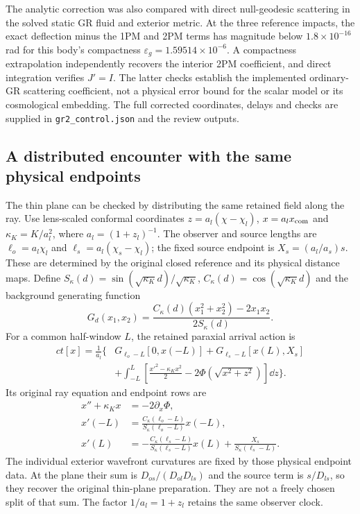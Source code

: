 The analytic correction was also compared with direct null-geodesic
scattering in the solved static GR fluid and exterior metric. At the
three reference impacts, the exact deflection minus the 1PM and 2PM
terms has magnitude below $1.8\times10^{-16}$ rad for this body's
compactness $\varepsilon_g=1.59514\times10^{-6}$.
A compactness extrapolation independently recovers the interior 2PM
coefficient, and direct integration verifies $J'=I$.
The latter checks establish the implemented ordinary-GR scattering
coefficient, not a physical error bound for the scalar model or its
cosmological embedding. The full corrected coordinates, delays and
checks are supplied in \texttt{gr2\_control.json} and the review outputs.

\subsection{A distributed encounter with the same physical endpoints}
\label{sec:distributed-control}
The thin plane can be checked by distributing the same retained field
along the ray. Use lens-scaled conformal coordinates
$z=a_l(\chi-\chi_l)$, $x=a_l x_{\rm com}$ and
$\kappa_K=K/a_l^2$, where $a_l=(1+z_l)^{-1}$.
The observer and source lengths are $\ell_o=a_l\chi_l$ and
$\ell_s=a_l(\chi_s-\chi_l)$; the fixed source endpoint is
$X_s=(a_l/a_s)s$. These are determined by the original closed reference
and its physical distance maps. Define
$S_\kappa(d)=\sin(\sqrt{\kappa_K}d)/\sqrt{\kappa_K}$,
$C_\kappa(d)=\cos(\sqrt{\kappa_K}d)$ and the background generating function
\begin{equation}
 G_d(x_1,x_2)=\frac{C_\kappa(d)(x_1^2+x_2^2)-2x_1x_2}
                   {2S_\kappa(d)}.
 \label{eq:background-generating}
\end{equation}
For a common half-window $L$, the retained paraxial arrival action is
\begin{align}
 ct[x]=\frac1{a_l}\Bigg\{&G_{\ell_o-L}[0,x(-L)]
 +G_{\ell_s-L}[x(L),X_s]\nonumber\\
 &+\int_{-L}^{L}\left[\frac{x'^2-\kappa_Kx^2}{2}
             -2\Phi(\sqrt{x^2+z^2})\right]\dd z\Bigg\}.
 \label{eq:distributed-action}
\end{align}
Its original ray equation and endpoint rows are
\begin{align}
 x''+\kappa_Kx&=-2\partial_x\Phi,\nonumber\\
 x'(-L)&=\frac{C_\kappa(\ell_o-L)}{S_\kappa(\ell_o-L)}x(-L),\nonumber\\
 x'(L)&=-\frac{C_\kappa(\ell_s-L)}{S_\kappa(\ell_s-L)}x(L)
              +\frac{X_s}{S_\kappa(\ell_s-L)}.
 \label{eq:distributed-rays}
\end{align}
The individual exterior wavefront curvatures are fixed by those physical
endpoint data. At the plane their sum is
$D_{os}/(D_{ol}D_{ls})$ and the source term is $s/D_{ls}$, so they
recover the original thin-plane preparation. They are not a freely
chosen split of that sum. The factor $1/a_l=1+z_l$ retains the same
observer clock.

